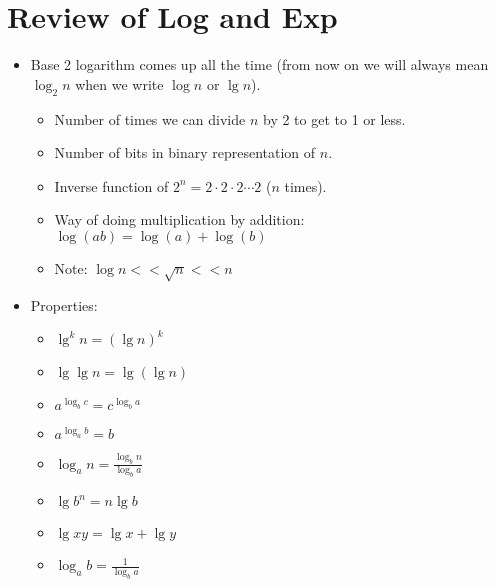 \documentclass[11pt]{article}
\begin{document}
\newpage
\section{Review of Log and Exp}
\begin{itemize}
\item Base 2 logarithm comes up all the time (from now on we will always
mean $\log_2 n$ when we write $\log n$ or $\lg n$).
 \begin{itemize}
 \item Number of times we can divide $n$ by 2 to get to 1 or less.
 \item Number of bits in binary representation of $n$.
 \item Inverse function of $2^n=2\cdot 2\cdot 2 \cdots 2$ ($n$ times).
 \item Way of doing multiplication by addition: $\log(ab)=\log(a)+\log(b)$
\item Note: $\log n << \sqrt{n} << n$

 \end{itemize}
\item Properties:

 \begin{itemize}
\item $\lg ^k n = (\lg n)^k$
\item $\lg \lg n = \lg (\lg n)$
\item $a ^ {\log_b c} = c^{\log_b a}$
\item $a^{\log_a b} = b$
\item $\log_a n = \frac{\log_b n}{\log_b a}$
\item $\lg b^n = n \lg b$
\item $\lg xy = \lg x + \lg y$
\item $\log_a b = \frac{1}{\log_b a}$ 
\end{itemize}
\end{itemize}
\end{document}
